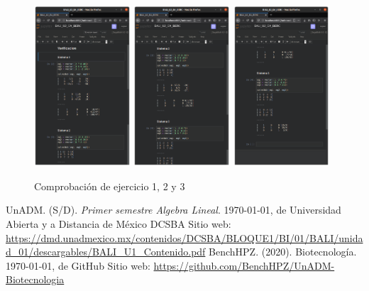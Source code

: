 \documentclass[11pt]{article}
\begin{document}
	\begin{figure}[h]
		\centering
		\includegraphics[width=0.32\textwidth]{BALI-U2-EA-1.png}
		\includegraphics[width=0.32\textwidth]{BALI-U2-EA-2.png}
		\includegraphics[width=0.32\textwidth]{BALI-U2-EA-3.png}
		\caption{Comprobaci\'on de ejercicio 1, 2 y 3}
	\end{figure}



\newpage
\begin{thebibliography}{X}

	 UnADM. (S/D). \emph{Primer semestre Algebra Lineal}. \today, de Universidad Abierta y a Distancia de México \textbar{} DCSBA Sitio web: \url{https://dmd.unadmexico.mx/contenidos/DCSBA/BLOQUE1/BI/01/BALI/unidad_01/descargables/BALI_U1_Contenido.pdf}
	 BenchHPZ. (2020). Biotecnolog\'ia. \today, de GitHub Sitio web: \url{https://github.com/BenchHPZ/UnADM-Biotecnologia}
	
\end{thebibliography}
\end{document}
